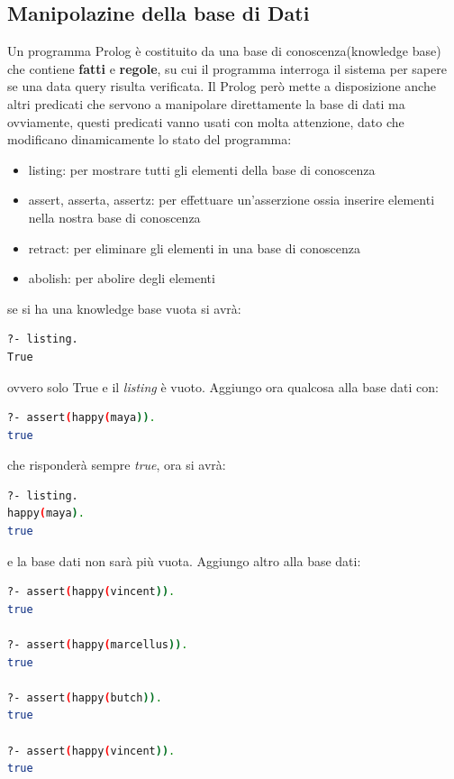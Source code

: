 \subsection{Manipolazine della base di Dati}
Un programma Prolog è costituito da una base di conoscenza(knowledge base) che contiene \textbf{fatti} e \textbf{regole},
su cui il programma interroga il sistema per sapere se una data query risulta verificata.\newline
Il Prolog però mette a disposizione anche altri predicati che servono a manipolare direttamente la base di dati ma ovviamente,
questi predicati vanno usati con molta attenzione, dato che modificano dinamicamente lo stato del programma:
\begin{itemize}
\item listing: per mostrare tutti gli elementi della base di conoscenza
\item assert, asserta, assertz: per effettuare un'asserzione ossia inserire elementi nella nostra base di conoscenza
\item retract: per eliminare gli elementi in una base di conoscenza
\item abolish: per abolire degli elementi
\end{itemize}
se si ha una knowledge base vuota si avrà:
\begin{shaded}
\begin{lstlisting}[language=bash]
?- listing.
True
\end{lstlisting}
\end{shaded}
ovvero solo True e il \textit{listing} è vuoto.\newline
Aggiungo ora qualcosa alla base dati con:
\begin{shaded}
\begin{lstlisting}[language=bash]
?- assert(happy(maya)).
true
\end{lstlisting}
\end{shaded}
che risponderà sempre \textit{true}, ora si avrà:
\begin{shaded}
\begin{lstlisting}[language=bash]
?- listing.
happy(maya).
true
\end{lstlisting}
\end{shaded}
e la base dati non sarà più vuota.\newline
Aggiungo altro alla base dati:
\begin{shaded}
\begin{lstlisting}[language=bash]
?- assert(happy(vincent)).
true

?- assert(happy(marcellus)).
true

?- assert(happy(butch)).
true

?- assert(happy(vincent)).
true
\end{lstlisting}
\end{shaded}
